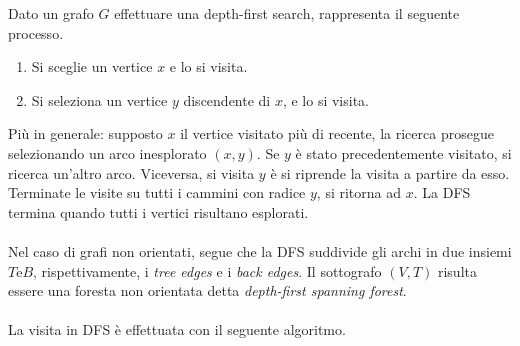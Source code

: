 \documentclass{subfiles}
\begin{document}
Dato un grafo \(G\) effettuare una depth-first search, rappresenta il seguente processo.
\begin{enumerate}
    \item Si sceglie un vertice \(x\) e lo si visita.
    \item Si seleziona un vertice \(y\) discendente di \(x\), e lo si visita.
\end{enumerate}

\noindent Più in generale: supposto \(x\) il vertice visitato più di recente, la ricerca prosegue selezionando un arco inesplorato \((x, y)\).
Se \(y\) è stato precedentemente visitato, si ricerca un'altro arco. Viceversa, si visita \(y\) è si riprende la visita a partire da esso.
Terminate le visite su tutti i cammini con radice \(y\), si ritorna ad \(x\). La DFS termina quando tutti i vertici risultano esplorati.
\\ \\
Nel caso di grafi non orientati, segue che la DFS suddivide gli archi in due insiemi \(T \text{e} B\), rispettivamente, i \emph{tree edges} e i \emph{back edges}.
Il sottografo \((V, T)\) risulta essere una foresta non orientata detta \emph{depth-first spanning forest}.
\\ \\
La visita in DFS è effettuata con il seguente algoritmo.

\end{document}
